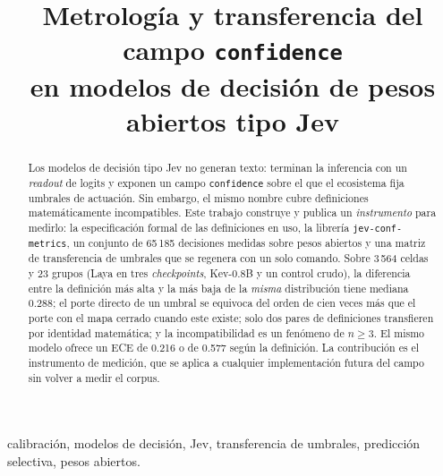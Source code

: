 \documentclass[conference]{IEEEtran}
\begin{document}
\title{Metrología y transferencia del campo \texttt{confidence}\\
en modelos de decisión de pesos abiertos tipo Jev}

\author{%
}

\maketitle

\begin{abstract}
Los modelos de decisión tipo Jev no generan texto: terminan la inferencia con un
\emph{readout} de logits y exponen un campo \texttt{confidence} sobre el que el ecosistema
fija umbrales de actuación. Sin embargo, el mismo nombre cubre definiciones
matemáticamente incompatibles. Este trabajo construye y publica un \emph{instrumento} para
medirlo: la especificación formal de las definiciones en uso, la librería
\texttt{jev-conf-\allowbreak metrics}, un conjunto de 65\,185 decisiones medidas sobre pesos abiertos y
una matriz de transferencia de umbrales que se regenera con un solo comando. Sobre 3\,564
celdas y 23 grupos (Laya en tres \emph{checkpoints}, Kev-0.8B y un control crudo), la
diferencia entre la definición más alta y la más baja de la \emph{misma} distribución tiene
mediana 0.288; el porte directo de un umbral se equivoca del orden de cien veces más que el
porte con el mapa cerrado cuando este existe; solo dos pares de definiciones transfieren por
identidad matemática; y la incompatibilidad es un fenómeno de $n \ge 3$. El mismo modelo
ofrece un ECE de 0.216 o de 0.577 según la definición. La contribución es el instrumento de medición, que se
aplica a cualquier implementación futura del campo sin volver a medir el corpus.
\end{abstract}

\begin{IEEEkeywords}
calibración, modelos de decisión, Jev, transferencia de umbrales, predicción selectiva,
pesos abiertos.
\end{IEEEkeywords}











\end{document}
